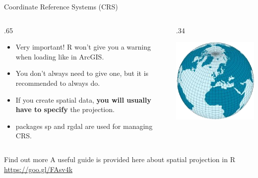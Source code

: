 \documentclass[10pt,ignorenonframetext,]{beamer}
\providecommand{\tightlist}{%
  \setlength{\itemsep}{0pt}\setlength{\parskip}{0pt}}
\def\begincols{\begin{columns}}
\def\begincol{\begin{column}}
\def\endcol{\end{column}}
\def\endcols{\end{columns}}
\begin{document}
\begin{frame}{Coordinate Reference Systems (CRS)}

\begincols
\begincol{.65\textwidth}

\begin{itemize}
\tightlist
\item
  Very important! R won't give you a warning when loading like in
  ArcGIS.
\item
  You don't always need to give one, but it is recommended to always do.
\item
  If you create spatial data, \textbf{you will usually have to specify}
  the projection.
\item
  packages \alert{sp} and \alert{rgdal} are used for managing CRS.
\end{itemize}

\endcol
\begincol{.34\textwidth}

\begin{center}\includegraphics[width=0.5\linewidth]{../images/CRS} \end{center}

\endcol
\endcols

\begin{alertblock}{Find out more}
A useful guide is provided here about spatial projection in R \url{https://goo.gl/FAsv4k}
\end{alertblock}

\end{frame}
\end{document}
